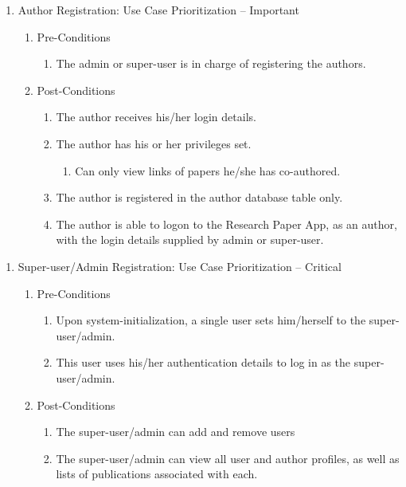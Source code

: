 \documentclass[10pt,a4paper]{exam}
\begin{document}
\begin{enumerate}
\item  Author Registration:  Use Case Prioritization -- Important

\begin{enumerate}
\item  Pre-Conditions

\begin{enumerate}
\item  The admin or super-user is in charge of registering the authors.
\end{enumerate}

\item  Post-Conditions

\begin{enumerate}
\item  The author receives his/her login details.

\item  The author has his or her privileges set.

\begin{enumerate}
\item  Can only view links of papers he/she has co-authored.
\end{enumerate}

\item  The author is registered in the author database table only.

\item  The author is able to logon to the Research Paper App, as an author, with the login details supplied by admin or super-user.
\end{enumerate}
\end{enumerate}
\end{enumerate}

\noindent  

\begin{enumerate}
\item  Super-user/Admin Registration: Use Case Prioritization -- Critical

\begin{enumerate}
\item  Pre-Conditions

\begin{enumerate}
\item  Upon system-initialization, a single user sets him/herself to the super-user/admin.

\item  This user uses his/her authentication details to log in as the super-user/admin.
\end{enumerate}

\item  Post-Conditions

\begin{enumerate}
\item  The super-user/admin can add and remove users

\item  The super-user/admin can view all user and author profiles, as well as lists of publications associated with each.
\end{enumerate}
\end{enumerate}
\end{enumerate}
\end{document}
